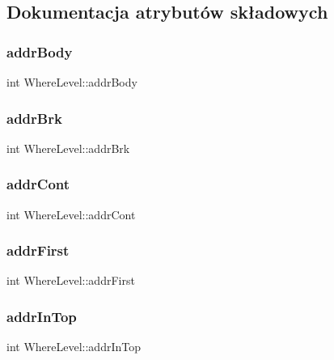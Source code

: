 \subsection{Dokumentacja atrybutów składowych}
\mbox{\label{struct_where_level_aa5e7bf3c8aa96edc0e65b7e669bfd49b}} 
\subsubsection{addrBody}
{\footnotesize\ttfamily int Where\+Level\+::addr\+Body}

\mbox{\label{struct_where_level_a06f788bd4109f394d162250af9582e45}} 
\subsubsection{addrBrk}
{\footnotesize\ttfamily int Where\+Level\+::addr\+Brk}

\mbox{\label{struct_where_level_a493d44d8f3b53d4d47191d751f8a9a94}} 
\subsubsection{addrCont}
{\footnotesize\ttfamily int Where\+Level\+::addr\+Cont}

\mbox{\label{struct_where_level_a2d87c8fb787ca4111d7ab38a838325a8}} 
\subsubsection{addrFirst}
{\footnotesize\ttfamily int Where\+Level\+::addr\+First}

\mbox{\label{struct_where_level_a3813cb6e47eeb9d488d22f8b5a599aa5}} 
\subsubsection{addrInTop}
{\footnotesize\ttfamily int Where\+Level\+::addr\+In\+Top}

\mbox{\label{struct_where_level_a903c5abe2bf15929b51a1d0921782531}} 
